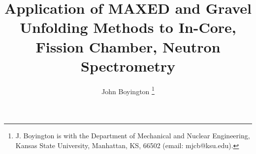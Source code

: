 \documentclass[journal]{IEEEtran}
\begin{document}
%
\title{Application of MAXED and Gravel Unfolding Methods to In-Core, Fission Chamber, Neutron Spectrometry}

\author{John Boyington%
\thanks{J. Boyington is with the Department
of Mechanical and Nuclear Engineering, Kansas State University, Manhattan,
KS, 66502 (email: mjcb@ksu.edu).}
}

% 
%



% 




\end{document}
